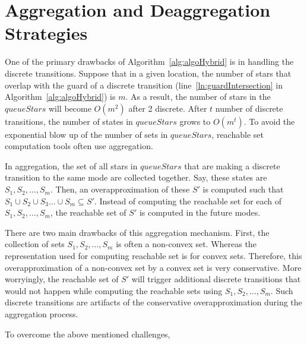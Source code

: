 \section{Aggregation and Deaggregation Strategies}
\label{sec:agdag}

One of the primary drawbacks of Algorithm~\ref{alg:algoHybrid} is in handling the discrete transitions. 
%
Suppose that in a given location, the number of stars that overlap with the guard of a discrete transition (line~\ref{ln:guardIntersection} in Algorithm~\ref{alg:algoHybrid}) is $m$.
%
As a result, the number of stars in the $queueStars$ will become $O(m^2)$ after 2 discrete. After $t$ number of discrete transitions, the number of states in $queueStars$ grows to $O(m^t)$.
%
To avoid the exponential blow up of the number of sets in $queueStars$, reachable set computation tools often use aggregation.

In aggregation, the set of all stars in $queueStars$ that are making a discrete transition to the same mode are collected together. 
%
Say, these states are $S_1, S_2, \ldots, S_m$.
%
Then, an overapproximation of these $S'$ is computed such that $S_1 \cup S_2 \cup S_3 \ldots \cup S_m \subseteq S'$. 
%
Instead of computing the reachable set for each of $S_1, S_2, \ldots, S_m$, the reachable set of $S'$ is computed in the future modes.

There are two main drawbacks of this aggregation mechanism. 
%
First, the collection of sets $S_1, S_2, \ldots, S_m$ is often a non-convex set. 
%
Whereas the representation used for computing reachable set is for convex sets. 
%
Therefore, this overapproximation of a non-convex set by a convex set is very conservative.
%
More worryingly, the reachable set of $S'$ will trigger additional discrete transitions that would not happen while computing the reachable sets using $S_1, S_2, \ldots, S_m$.
%
Such discrete transitions are artifacts of the conservative overapproximation during the aggregation process.


To overcome the above mentioned challenges, 
